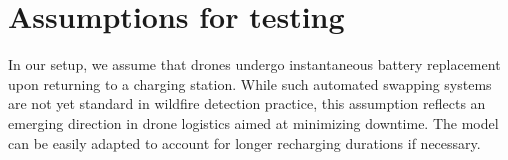 \documentclass{article}
\newcommand{\danique}[1]{\textcolor{blue}{#1}}
\begin{document}
\section{Assumptions for testing}
In our setup, we assume that drones undergo instantaneous battery replacement upon returning to a charging station. While such automated swapping systems are not yet standard in wildfire detection practice, this assumption reflects an emerging direction in drone logistics aimed at minimizing downtime. The model can be easily adapted to account for longer recharging durations if necessary.

\end{document}
